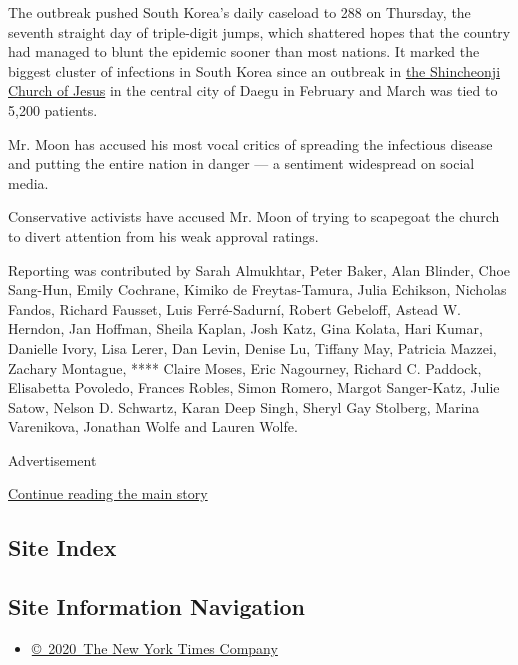The outbreak pushed South Korea's daily caseload to 288 on Thursday, the
seventh straight day of triple-digit jumps, which shattered hopes that
the country had managed to blunt the epidemic sooner than most nations.
It marked the biggest cluster of infections in South Korea since an
outbreak in
\href{https://www.nytimes3xbfgragh.onion/2020/02/21/world/asia/south-korea-coronavirus-shincheonji.html?action=click\&module=RelatedLinks\&pgtype=Article}{the
Shincheonji Church of Jesus} in the central city of Daegu in February
and March was tied to 5,200 patients.

Mr. Moon has accused his most vocal critics of spreading the infectious
disease and putting the entire nation in danger --- a sentiment
widespread on social media.

Conservative activists have accused Mr. Moon of trying to scapegoat the
church to divert attention from his weak approval ratings.

Reporting was contributed by Sarah Almukhtar, Peter Baker, Alan Blinder,
Choe Sang-Hun, Emily Cochrane, Kimiko de Freytas-Tamura, Julia Echikson,
Nicholas Fandos, Richard Fausset, Luis Ferré-Sadurní, Robert Gebeloff,
Astead W. Herndon, Jan Hoffman, Sheila Kaplan, Josh Katz, Gina Kolata,
Hari Kumar, Danielle Ivory, Lisa Lerer, Dan Levin, Denise Lu, Tiffany
May, Patricia Mazzei, Zachary Montague, **** Claire Moses, Eric
Nagourney, Richard C. Paddock, Elisabetta Povoledo, Frances Robles,
Simon Romero, Margot Sanger-Katz, Julie Satow, Nelson D. Schwartz, Karan
Deep Singh, Sheryl Gay Stolberg, Marina Varenikova, Jonathan Wolfe and
Lauren Wolfe.

Advertisement

\protect\hyperlink{after-bottom}{Continue reading the main story}

\hypertarget{site-index}{%
\subsection{Site Index}\label{site-index}}

\hypertarget{site-information-navigation}{%
\subsection{Site Information
Navigation}\label{site-information-navigation}}

\begin{itemize}
\tightlist
\item
  \href{https://help.nytimes3xbfgragh.onion/hc/en-us/articles/115014792127-Copyright-notice}{©~2020~The
  New York Times Company}
\end{itemize}

